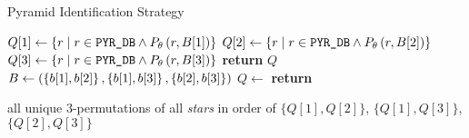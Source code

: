 \begin{algorithm}
    \caption{Pyramid Identification Strategy} \label{algorithm:pyramidIdentification}
    \begin{algorithmic}[1]
        \State $Q[1] \gets \left\{  r \mid r \in \texttt{PYR\_DB} \land P_\theta \left(r, B[1]\right)  \right\}$
        \State $Q[2] \gets \left\{  r \mid r \in \texttt{PYR\_DB} \land P_\theta \left(r, B[2]\right)  \right\}$
        \State $Q[3] \gets \left\{  r \mid r \in \texttt{PYR\_DB} \land P_\theta \left(r, B[3]\right)  \right\}$
        \State \textbf{return} $Q$
        \EndFunction
        \\
        \State $B \gets \left(\left\{ b[1], b[2] \right\}, \left\{ b[1], b[3] \right\}, \left\{ b[2], b[3] \right\}\right)$
        \State $Q \gets $ 
        \State \textbf{return} \parbox[t]{0.8\textwidth}{\raggedright all unique 3-permutations of all \emph{stars} in order \newline of $\{Q[1], Q[2]\}$, $\{Q[1], Q[3]\}$, $\{Q[2], Q[3]\}$}

\end{algorithmic}
\end{algorithm}
